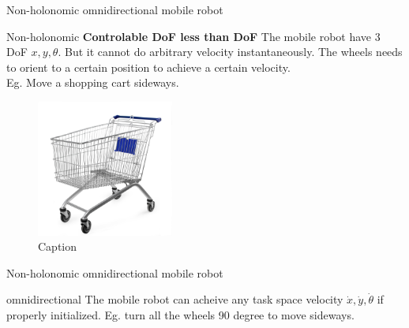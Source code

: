 \documentclass[10pt]{beamer}
\begin{document}
\begin{frame}{Non-holonomic omnidirectional mobile robot}
    	\begin{alertblock}{Non-holonomic}
		\textbf{Controlable DoF less than DoF} The mobile robot have 3 DoF $x,y,\theta$. But it cannot do arbitrary velocity instantaneously. The wheels needs to orient to a certain position to achieve a certain velocity.\\ Eg. Move a shopping cart sideways.
		\begin{figure}
		    \centering
		    \includegraphics[width=0.4\textwidth]{Figure/shoppingcartwalmart.jpg}
		    \caption{Caption}
		    \label{fig:my_label}
		\end{figure}
	\end{alertblock}
\end{frame}
\begin{frame}{Non-holonomic omnidirectional mobile robot}
    	\begin{alertblock}{omnidirectional}
		The mobile robot can acheive any task space velocity $\dot{x},\dot{y},\dot{\theta}$ if properly initialized.
		Eg. turn all the wheels 90 degree to move sideways.
	\end{alertblock}
\end{frame}


\end{document}
